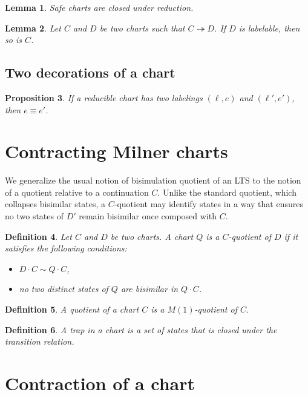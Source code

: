 \documentclass{article}
\newtheorem{definition}{Definition}[section]
\newtheorem{lemma}[definition]{Lemma}
\newtheorem{proposition}[definition]{Proposition}
\begin{document}
\begin{lemma} Safe charts are closed under reduction.\end{lemma}
    \begin{lemma}
    Let $C$ and $D$ be two charts such that $C \twoheadrightarrow D$. If $D$ is labelable,
     then so is $C$.   \end{lemma}

     \subsection{Two decorations of a chart}

\begin{proposition}
    If a reducible chart has two labelings  $(\ell,e)$ and $(\ell',e')$, then $e \equiv e'$.~\label{prop:two-decorations-implies-equiv}
\end{proposition}


\section{Contracting Milner charts}

We generalize the usual notion of bisimulation quotient of an LTS to the notion of a quotient relative to a continuation $C$.
Unlike the standard quotient, which collapses bisimilar states, 
a $C$-quotient may identify states in a way that ensures no two states of $D'$ remain bisimilar once composed with $C$.

\begin{definition}
Let $C$ and $D$ be  two charts.  A chart $Q$ is a \emph{ $C$-quotient} of $D$ if it satisfies the following conditions:
\begin{itemize}
  \item $D \cdot C \sim Q \cdot C$,
  \item no two distinct states of $Q$ are bisimilar in $Q \cdot C$.
\end{itemize}
\end{definition}

\begin{definition} A quotient of a chart $C$ is a $M(1)$-quotient of $C$.
\end{definition}
 
\begin{definition}
 A \emph{trap} in a chart is a set of states that is closed under the transition relation.
 \end{definition}

\section{Contraction of a chart}
\end{document}
